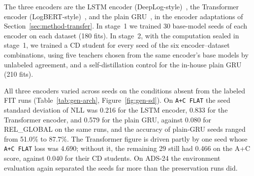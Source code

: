 The three encoders are the
LSTM encoder (DeepLog-style)~\cite{hochreiter1997long, du2017deeplog},
the Transformer encoder (LogBERT-style)~\cite{vaswani2017attention, guo2021logbert}, and the plain GRU~\cite{cho2014gru}, in the encoder
adaptations of Section~\ref{sec:method-transfer}. In stage~1 we trained 30 base-model seeds of
each encoder on each dataset (180 fits). In stage~2, with the
computation sealed in stage~1, we trained a CD student for every seed
of the six encoder--dataset combinations, using five teachers chosen
from the same encoder's base models by unlabeled agreement, and a
self-distillation control for the in-house plain GRU (210 fits).

All three encoders varied across seeds on the conditions absent from
the labeled FIT runs (Table~\ref{tab:gen-arch}, Figure~\ref{fig:gen-sd}). On \texttt{A+C FLAT} the seed standard
deviation of NLL was 0.216 for the LSTM encoder, 0.833 for the
Transformer encoder, and 0.579 for the plain GRU, against 0.080 for
REL\_GLOBAL on the same runs, and the accuracy of plain-GRU seeds ranged
from 51.0\% to 87.7\%. The Transformer figure is driven partly by one
seed whose \texttt{A+C FLAT} loss was 4.690; without it, the remaining
29 still had 0.466 on the A+C score, against 0.040 for their CD
students. On ADS-24 the environment evaluation again separated the
seeds far more than the preservation runs did.

